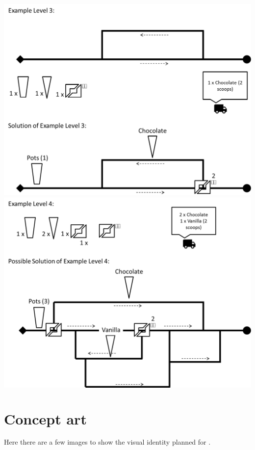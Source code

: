 \documentclass[a4paper]{scrartcl}
\begin{document}
		\includegraphics[width=\textwidth]{levels/03}
		\includegraphics[width=\textwidth]{levels/04}

\section{Concept art}
    Here there are a few images to show the visual identity planned for \gamename.
\end{document}
